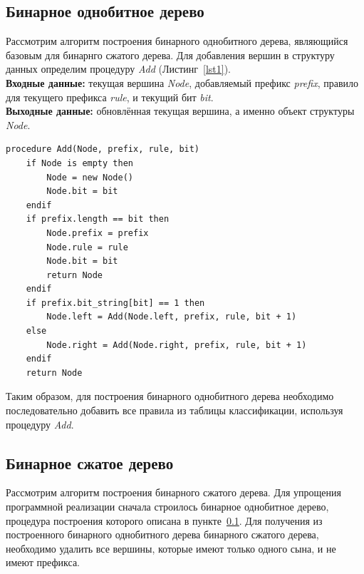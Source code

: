 \documentclass[9pt,a4paper]{article}
\begin{document}
        \subsection{Бинарное однобитное дерево}
        \label{section:binone}
            Рассмотрим алгоритм построения бинарного однобитного дерева, являющийся базовым для бинарнго сжатого дерева.
            Для добавления вершин в структуру данных определим процедуру \emph{Add} (Листинг~\ref{lst1}).\\
            {\bf Входные данные:} текущая вершина \emph{Node}, добавляемый префикс \emph{prefix}, правило для текущего префикса \emph{rule}, и текущий бит \emph{bit}.\\
            {\bf Выходные данные:} обновлённая текущая вершина, а именно объект структуры \emph{Node}.
\\
\begin{lstlisting}[caption=Процедура добавления вершины в бинарное однобитное дерево., label=lst1]
procedure Add(Node, prefix, rule, bit)
    if Node is empty then
        Node = new Node()
        Node.bit = bit
    endif
    if prefix.length == bit then
        Node.prefix = prefix
        Node.rule = rule
        Node.bit = bit
        return Node
    endif
    if prefix.bit_string[bit] == 1 then
        Node.left = Add(Node.left, prefix, rule, bit + 1)
    else
        Node.right = Add(Node.right, prefix, rule, bit + 1)
    endif
    return Node
\end{lstlisting}
\vspace{1em}
            Таким образом, для построения бинарного однобитного дерева необходимо последовательно добавить все правила из таблицы классификации,
            используя процедуру \emph{Add}.

        \subsection{Бинарное сжатое дерево}
            Рассмотрим алгоритм построения бинарного сжатого дерева. Для упрощения программной реализации сначала строилось бинарное однобитное дерево,
            процедура построения которого описана в пункте~\ref{section:binone}. Для получения из построенного бинарного однобитного дерева бинарного сжатого дерева,
            необходимо удалить все вершины, которые имеют только одного сына, и не имеют префикса.
\end{document}
